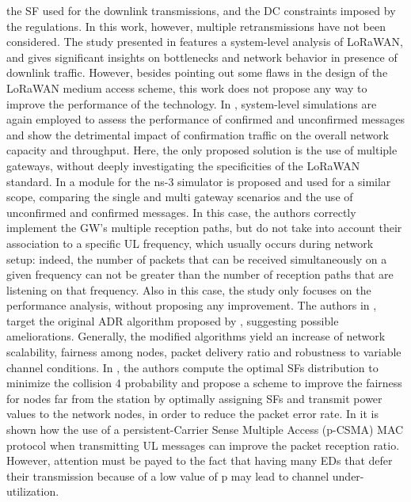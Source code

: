	the SF used for the downlink transmissions,
	and the DC constraints imposed by the regulations.
In this work,
	however,
	multiple retransmissions have not been considered.
The study presented in \cite{pop_does_2017} features a system-level analysis of LoRaWAN,
	and gives significant insights on bottlenecks and network behavior in presence of downlink traffic.
However,
	besides pointing out some flaws in the design of the LoRaWAN medium access scheme,
	this work does not propose any way to improve the performance of the technology.
In \cite{vandenabeele_scalability_2017},
	system-level simulations are again employed to assess the performance of confirmed and unconfirmed messages and show the detrimental impact of confirmation traffic on the overall network capacity and throughput.
Here,
	the only proposed solution is the use of multiple gateways,
	without deeply investigating the specificities of the LoRaWAN standard.
In \cite{reynders_lorawan_2018} a module for the ns-3 simulator is proposed and used for a similar scope,
	comparing the single and multi gateway scenarios and the use of unconfirmed and confirmed messages.
In this case,
	the authors correctly implement the GW’s multiple reception paths,
	but do not take into account their association to a specific UL frequency,
	which usually occurs during network setup:
	indeed,
	the number of packets that can be received simultaneously on a given frequency can not be greater than the number of reception paths that are listening on that frequency.
Also in this case,
	the study only focuses on the performance analysis,
	without proposing any improvement.
The authors in \cite{hauser_proposal_2017},
	\cite{slabicki_adaptive_2018} target the original ADR algorithm proposed by \cite{thethingsnetwork},
	suggesting possible ameliorations.
Generally,
	the modified algorithms yield an increase of network scalability,
	fairness among nodes,
	packet delivery ratio and robustness to variable channel conditions.
In \cite{reynders_power_2017},
	the authors compute the optimal SFs distribution to minimize the collision 4 probability and propose a scheme to improve the fairness for nodes far from the station by optimally assigning SFs and transmit power values to the network nodes,
	in order to reduce the packet error rate.
In \cite{kouvelas_employing_2018} it is shown how the use of a persistent-Carrier Sense Multiple Access (p-CSMA) MAC protocol when transmitting UL messages can improve the packet reception ratio.
However,
	attention must be payed to the fact that having many EDs that defer their transmission because of a low value of p may lead to channel under-utilization.
